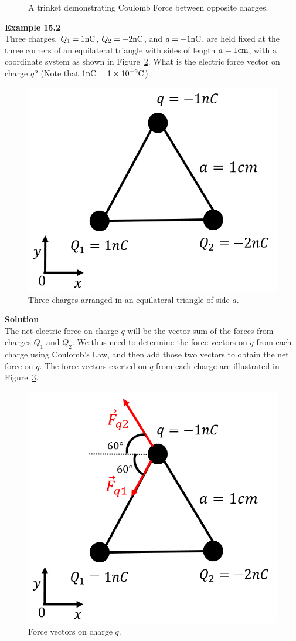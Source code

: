 \begin{figure}[!htbp]
\centering
\caption[]{A trinket demonstrating Coulomb Force between opposite charges.}
\label{chap:chargesfields:coulombtrinket}
\end{figure}

\begin{framed}
\textbf{Example 15.2}\\
Three charges, $Q_1=1 {\rm nC}$, $Q_2= -2 {\rm nC}$, and $q= -1 {\rm nC}$, are held fixed at the three corners of an equilateral triangle with sides of length $a=1 {\rm cm}$, with a coordinate system as shown in Figure~\ref{fig:chargesfields:chargetriangle}. What is the electric force vector on charge $q$? (Note that $1 {\rm nC}=1\times 10^{ -9} {\rm C}$).

\begin{figure}[!htbp]
\centering
\includegraphics[width=0.4\linewidth]{files/chargetriangle-6c806c6caa350d0b775548735919e542.png}
\caption[]{Three charges arranged in an equilateral triangle of side $a$.}
\label{fig:chargesfields:chargetriangle}
\end{figure}

\begin{framed}
\textbf{Solution}\\
The net electric force on charge $q$ will be the vector sum of the forces from charges $Q_1$ and $Q_2$. We thus need to determine the force vectors on $q$ from each charge using Coulomb's Law, and then add those two vectors to obtain the net force on $q$. The force vectors exerted on $q$ from each charge are illustrated in Figure~\ref{fig:chargesfields:chargetriangle_sol}.

\begin{figure}[!htbp]
\centering
\includegraphics[width=0.4\linewidth]{files/chargetriangle_sol-8952ca5b443a1c0f12a01e7a166f9cfb.png}
\caption[]{Force vectors on charge $q$.}
\label{fig:chargesfields:chargetriangle_sol}
\end{figure}


\end{framed}
\end{framed}
